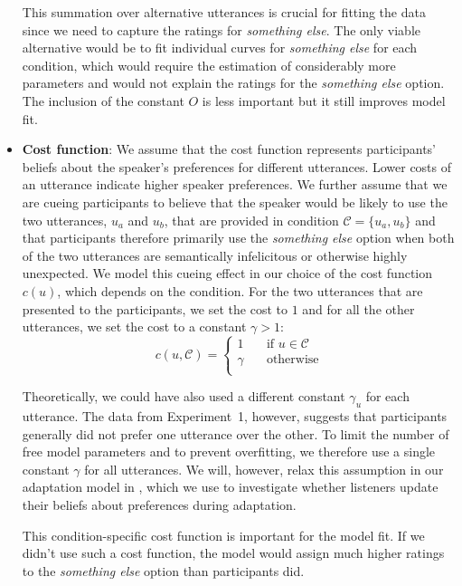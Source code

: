 \begin{itemize}
This summation over alternative utterances is crucial for fitting the data since we need to
capture the ratings for \textit{something else}. The only viable alternative would be
to fit individual curves for \textit{something else} for each condition, which would require
the estimation of considerably more parameters and would not explain the ratings for the
\textit{something else} option. The inclusion of the constant $O$ is less important but it
still improves model fit.


\item \textbf{Cost function}: We assume that the cost function represents participants' beliefs about the speaker's 
preferences for different utterances. Lower costs of an utterance indicate higher speaker preferences. We further 
assume that we are cueing participants to believe that the speaker would be likely to use the two utterances, $u_a$ 
and $u_b$, that are provided in condition $\mathscr{C}=\{u_a, u_b\}$ and that participants therefore primarily use the 
\textit{something else} option when both of the two utterances are semantically infelicitous or otherwise highly unexpected. 
We model this cueing effect in our choice of the cost function $c(u)$, which depends on the condition. For the two utterances 
that are presented to the participants, we set the cost to $1$ and for all the other utterances, we set the cost to a constant $\gamma > 1$:
$$
c(u, \mathscr{C}) = 
     \begin{cases}
       1 &\quad\text{if } u  \in \mathscr{C}\\
       \gamma &\quad\text{otherwise} \\
     \end{cases}
$$

Theoretically, we could have also used a different constant $\gamma_u$ for each utterance. The data from
Experiment~1, however, suggests that participants generally did not prefer one utterance over 
the other. To limit the number of free model parameters and to prevent overfitting, we therefore use a single
constant $\gamma$ for all utterances. We will, however, relax this assumption in our adaptation model in , which
we use to investigate whether listeners update their beliefs about preferences during adaptation.

This condition-specific cost function is important for the model fit. If we didn't use such a cost function, 
the model would assign much higher ratings to the \textit{something else} option than participants did.


\end{itemize}
